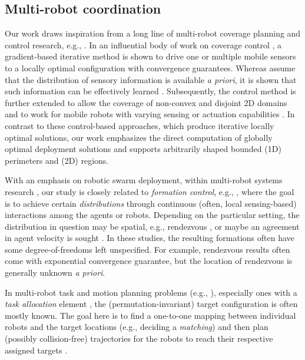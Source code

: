 \subsection{Multi-robot coordination} 
Our work draws inspiration from a long line of multi-robot coverage planning and 
control research, e.g., \cite{cortes2004coverage,martinez2007motion,
schwager2009optimal,pavone2009equitable,schwager2009decentralized,
pierson2017adapting}. 
%
In an influential body of work on coverage control \cite{cortes2004coverage,
martinez2007motion}, a gradient-based iterative method is shown to drive 
one or multiple mobile sensors to a locally optimal configuration with 
convergence guarantees. 
%
Whereas \cite{cortes2004coverage,martinez2007motion} assume that the 
distribution of sensory information is available {\em a priori}, it is 
shown that such information can be effectively learned 
\cite{schwager2009decentralized}. 
%
Subsequently, the control method is further extended to allow the 
coverage of non-convex and disjoint 2D domains \cite{schwager2009optimal} 
and to work for mobile robots with varying sensing or actuation capabilities
\cite{pierson2017adapting}. 
%
In contrast to these control-based approaches, which produce iterative 
locally optimal solutions, our work emphasizes the direct computation of 
globally optimal deployment solutions and supports arbitrarily shaped
bounded (1D) perimeters and (2D) regions.

With an emphasis on robotic swarm deployment, within multi-robot 
systems research \cite{arai2002advances,gerkey2004formal,ren2008distributed,bullo2009distributed}, 
our study is closely related to {\em formation control}, e.g., 
\cite{ando1999distributed,jadbabaie2003coordination,olfati2004consensus,ren2005consensus,cheng2008almost,mesbahi2010graph,yu2012rendezvous},
where the goal is to achieve certain {\em distributions} through 
continuous (often, local sensing-based) interactions among the 
agents or robots. Depending on the particular setting, the 
distribution in question may be spatial, e.g., rendezvous
\cite{ando1999distributed,yu2012rendezvous}, or maybe an agreement 
in agent velocity is sought \cite{jadbabaie2003coordination,ren2005consensus}. 
In these studies, the resulting formations often have some 
degree-of-freedoms left unspecified. For example, rendezvous 
results \cite{ando1999distributed,yu2012rendezvous} often come 
with exponential convergence guarantee, but the location of
rendezvous is generally unknown {\em a priori}. 

In multi-robot task and motion planning problems (e.g.,
\cite{smith2009monotonic,ayanian2010decentralized,liu2011multi,liu2013optimal,turpin2014goal,turpin2014capt,alonso2015multi,SolYu15}), 
especially ones with a {\em task allocation} element 
\cite{smith2009monotonic,liu2011multi,liu2013optimal,turpin2014goal,turpin2014capt,SolYu15},
the (permutation-invariant) target configuration is often mostly 
known. The goal here is to find a one-to-one mapping between individual 
robots and the target locations (e.g., deciding a {\em matching}) and 
then plan (possibly collision-free) trajectories for the robots to reach 
their respective assigned targets \cite{turpin2014goal,turpin2014capt,SolYu15}.  

